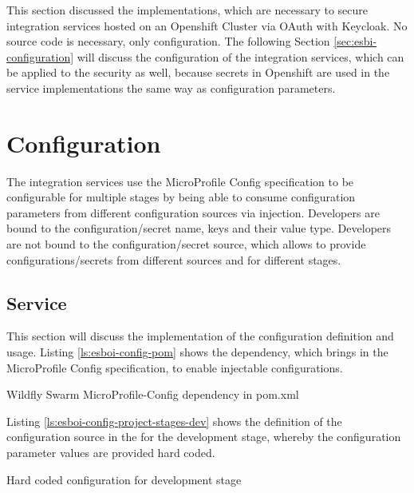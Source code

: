This section discussed the implementations, which are necessary to secure integration services hosted on an Openshift Cluster via OAuth with Keycloak. No source code is necessary, only configuration. The following Section \vref{sec:esbi-configuration} will discuss the configuration of the integration services, which can be applied to the security as well, because secrets in Openshift are used in the service implementations the same way as configuration parameters.

\section{Configuration}
\label{sec:esbi-configuration}
The integration services use the MicroProfile Config specification to be configurable for multiple stages by being able to consume configuration parameters from different configuration sources via injection. Developers are bound to the configuration/secret name, keys and their value type. Developers are not bound to the configuration/secret source, which allows to provide configurations/secrets from different sources and for different stages. 

\subsection{Service}
\label{sec:esbi-config-service}
This section will discuss the implementation of the configuration definition and usage. Listing \vref{ls:esboi-config-pom} shows the dependency, which brings in the MicroProfile Config specification, to enable injectable configurations.
 
\begin{listing}[h]
	\caption{Wildfly Swarm MicroProfile-Config dependency in pom.xml}
	\label{ls:esboi-config-pom}
\end{listing}

Listing \vref{ls:esboi-config-project-stages-dev} shows the definition of the configuration source in the  for the development stage, whereby the configuration parameter values are provided hard coded.
\newpage

\begin{listing}[h]
	\caption{Hard coded configuration for development stage}
	\label{ls:esboi-config-project-stages-dev}
\end{listing}


